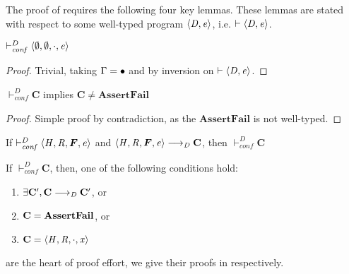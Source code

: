 The proof of  requires the following four key lemmas. These lemmas are stated
with respect to some well-typed program $ \left\langle{ \mathit{D} ,  \mathit{e} }\right\rangle $, i.e. $\vdash   \left\langle{ \mathit{D} ,  \mathit{e} }\right\rangle $.
\begin{lemma}
  \label{lem:initial}
  $ \vdash_{\mathit{conf} }^D   \left\langle{  \emptyset  ,   \emptyset  ,   \cdot  ,  \mathit{e} }\right\rangle  $
\end{lemma}
\begin{proof}
  Trivial, taking $\Gamma  =   \bullet $ and by inversion on $\vdash   \left\langle{ \mathit{D} ,  \mathit{e} }\right\rangle $.
\end{proof}

\begin{lemma}
  \label{lem:assertfail}
  $ \vdash_{\mathit{conf} }^D  \mathbf{C} $ implies $ \mathbf{C}  \neq   \mathbf{AssertFail}  $
\end{lemma}
\begin{proof}
  Simple proof by contradiction, as the $ \mathbf{AssertFail} $ is not well-typed.
\end{proof}
  
\begin{lemma}
  \label{lem:preservation}
  If $ \vdash_{\mathit{conf} }^D   \tuple{ \ottnt{H} ,  \ottnt{R} ,  \oldvec{F} ,  \ottnt{e} }  $ and $  \tuple{ \ottnt{H} ,  \ottnt{R} ,  \oldvec{F} ,  \ottnt{e} }     \longrightarrow _{ \ottnt{D} }    \mathbf{C} $, then $ \vdash_{\mathit{conf} }^D  \mathbf{C} $
\end{lemma}
\begin{lemma}
  \label{lem:progress}
  If $ \vdash_{\mathit{conf} }^D  \mathbf{C} $, then, one of the following conditions hold:
  \begin{enumerate}
  \item $\exists \mathbf{C}', \mathbf{C}    \longrightarrow _{ \mathit{D} }    \mathbf{C}' $, or
  \item $\mathbf{C}  =   \mathbf{AssertFail} $, or
  \item $\mathbf{C}  =   \left\langle{ \mathit{H} ,  \mathit{R} ,   \cdot  ,  \mathit{x} }\right\rangle $
  \end{enumerate}
\end{lemma}
 are the heart of proof effort, we give their proofs in 
respectively.

